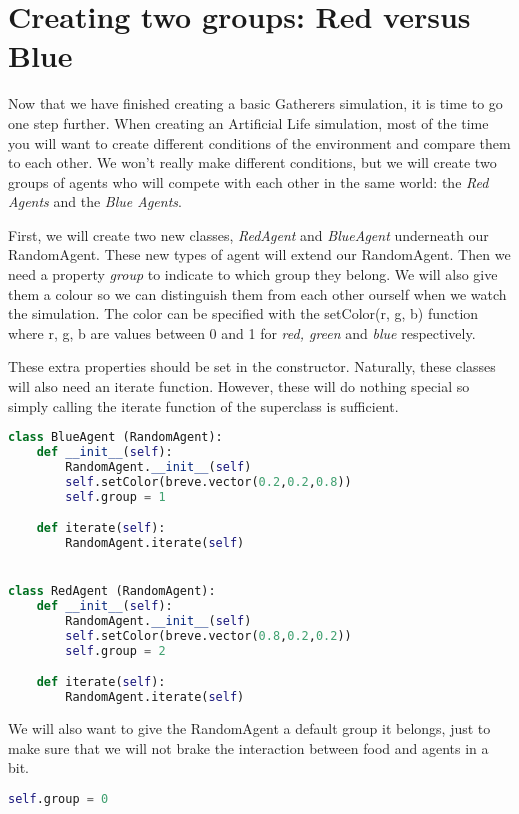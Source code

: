 \section{Creating two groups: Red versus Blue}
Now that we have finished creating a basic Gatherers simulation, it is time to go one step further. When creating an Artificial Life simulation, most of the time you will want to create different conditions of the environment and compare them to each other. We won't really make different conditions, but we will create two groups of agents who will compete with each other in the same world: the \textit{Red Agents} and the \textit{Blue Agents}.

First, we will create two new classes, \textit{RedAgent}  and \textit{BlueAgent} underneath our RandomAgent. These new types of agent will extend our RandomAgent. Then we need a property \textit{group} to indicate to which group they belong. We will also give them a colour so we can distinguish them from each other ourself when we watch the simulation. The color can be specified with the setColor(r, g, b) function where r, g, b are values between 0 and 1 for \textit{red, green} and \textit{blue} respectively. 

These extra properties should be set in the constructor. Naturally, these classes will also need an iterate function. However, these will do nothing special so simply calling the iterate function of the superclass is sufficient. 


\begin{lstlisting}[language=Python]
class BlueAgent (RandomAgent):
	def __init__(self):
		RandomAgent.__init__(self)
		self.setColor(breve.vector(0.2,0.2,0.8))
		self.group = 1

	def iterate(self):
		RandomAgent.iterate(self)


class RedAgent (RandomAgent):
	def __init__(self):
		RandomAgent.__init__(self)
		self.setColor(breve.vector(0.8,0.2,0.2))
		self.group = 2

	def iterate(self):
		RandomAgent.iterate(self)
\end{lstlisting}

We will also want to give the RandomAgent a default group it belongs, just to make sure that we will not brake the interaction between food and agents in a bit.


\begin{lstlisting}[language=Python]
self.group = 0
\end{lstlisting}